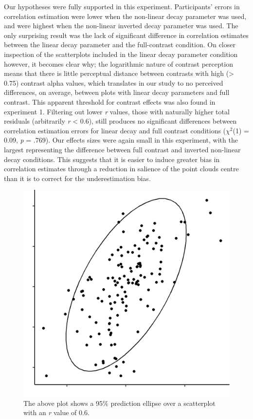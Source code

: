\documentclass[preprint, 3p,
authoryear]{elsarticle} %
\begin{document}
Our hypotheses were fully supported in this experiment. Participants'
errors in correlation estimation were lower when the non-linear decay
parameter was used, and were highest when the non-linear inverted decay
parameter was used. The only surprising result was the lack of
significant difference in correlation estimates between the linear decay
parameter and the full-contrast condition. On closer inspection of the
scatterplots included in the linear decay parameter condition however,
it becomes clear why; the logarithmic nature of contrast perception
\citep{varshney_2013, fechner_1948} means that there is little
perceptual distance between contrasts with high (\textgreater{} 0.75)
contrast alpha values, which translates in our study to no perceived
differences, on average, between plots with linear decay parameters and
full contrast. This apparent threshold for contrast effects was also
found in experiment 1. Filtering out lower \emph{r} values, those with
naturally higher total residuals (arbitrarily \emph{r} \textless{} 0.6),
still produces no significant differences between correlation estimation
errors for linear decay and full contrast conditions (\(\chi^2\)(1) =
0.09, \emph{p} = .769). Our effects sizes were again small in this
experiment, with the largest representing the difference between full
contrast and inverted non-linear decay conditions. This suggests that it
is easier to induce greater bias in correlation estimates through a
reduction in salience of the point clouds centre than it is to correct
for the underestimation bias.

\begin{figure}

\includegraphics[width=0.5\linewidth]{images/prediction_ellipse} \hfill{}

\caption{\label{prediction-ellipse}The above plot shows a 95\% prediction ellipse over a scatterplot with an \textit{r} value of 0.6.}\label{fig:prediction-ellipse}
\end{figure}
\end{document}
